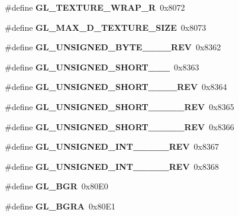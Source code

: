 \begin{DoxyCompactItemize}
\item 
\#define {\bfseries G\+L\+\_\+\+T\+E\+X\+T\+U\+R\+E\+\_\+\+W\+R\+A\+P\+\_\+\+R}~0x8072\label{_s_d_l__opengl_8h_a1b69ad7ea841f21165a25e58411b6bab}

\item 
\#define {\bfseries G\+L\+\_\+\+M\+A\+X\+\_\+D\+\_\+\+T\+E\+X\+T\+U\+R\+E\+\_\+\+S\+I\+Z\+E}~0x8073\label{_s_d_l__opengl_8h_a9eb2f6fcd1311d528057b82ea84ad75f}

\item 
\#define {\bfseries G\+L\+\_\+\+U\+N\+S\+I\+G\+N\+E\+D\+\_\+\+B\+Y\+T\+E\+\_\+\_\+\_\+\_\+\+R\+E\+V}~0x8362\label{_s_d_l__opengl_8h_aebe39160c74c33c76b1e77695a179747}

\item 
\#define {\bfseries G\+L\+\_\+\+U\+N\+S\+I\+G\+N\+E\+D\+\_\+\+S\+H\+O\+R\+T\+\_\+\_\+\_}~0x8363\label{_s_d_l__opengl_8h_aecec622a15619219f88d13271b5fd581}

\item 
\#define {\bfseries G\+L\+\_\+\+U\+N\+S\+I\+G\+N\+E\+D\+\_\+\+S\+H\+O\+R\+T\+\_\+\_\+\_\+\_\+\+R\+E\+V}~0x8364\label{_s_d_l__opengl_8h_a513c57ee211a7cb499956f20e1f0363d}

\item 
\#define {\bfseries G\+L\+\_\+\+U\+N\+S\+I\+G\+N\+E\+D\+\_\+\+S\+H\+O\+R\+T\+\_\+\_\+\_\+\_\+\_\+\+R\+E\+V}~0x8365\label{_s_d_l__opengl_8h_a30dd1a52571e3a1deffa686bf1208c68}

\item 
\#define {\bfseries G\+L\+\_\+\+U\+N\+S\+I\+G\+N\+E\+D\+\_\+\+S\+H\+O\+R\+T\+\_\+\_\+\_\+\_\+\_\+\+R\+E\+V}~0x8366\label{_s_d_l__opengl_8h_ae0f0fe9a3a82b9a25d0d35aa20931097}

\item 
\#define {\bfseries G\+L\+\_\+\+U\+N\+S\+I\+G\+N\+E\+D\+\_\+\+I\+N\+T\+\_\+\_\+\_\+\_\+\_\+\+R\+E\+V}~0x8367\label{_s_d_l__opengl_8h_aeafffc5d69d3f9e05af201e59c0e78d3}

\item 
\#define {\bfseries G\+L\+\_\+\+U\+N\+S\+I\+G\+N\+E\+D\+\_\+\+I\+N\+T\+\_\+\_\+\_\+\_\+\_\+\+R\+E\+V}~0x8368\label{_s_d_l__opengl_8h_aefaf553edc188af69b624b40bbecc380}

\item 
\#define {\bfseries G\+L\+\_\+\+B\+G\+R}~0x80\+E0\label{_s_d_l__opengl_8h_a35d2992fb6ceb223785f916798c69901}

\item 
\#define {\bfseries G\+L\+\_\+\+B\+G\+R\+A}~0x80\+E1\label{_s_d_l__opengl_8h_a56707576fd3e2da55343c25da155294d}


\end{DoxyCompactItemize}
